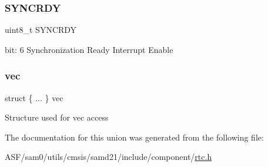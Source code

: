 \subsubsection{\texorpdfstring{SYNCRDY}{SYNCRDY}}
{\footnotesize\ttfamily uint8\+\_\+t S\+Y\+N\+C\+R\+DY}

bit\+: 6 Synchronization Ready Interrupt Enable \mbox{\label{union_r_t_c___m_o_d_e1___i_n_t_e_n_c_l_r___type_ab3be936ce0db4a1e87c079053de83727}} 
\subsubsection{\texorpdfstring{vec}{vec}}
{\footnotesize\ttfamily struct \{ ... \}   vec}

Structure used for vec access 

The documentation for this union was generated from the following file\+:\begin{DoxyCompactItemize}
\item 
A\+S\+F/sam0/utils/cmsis/samd21/include/component/\mbox{\hyperlink{component_2rtc_8h}{rtc.\+h}}\end{DoxyCompactItemize}
